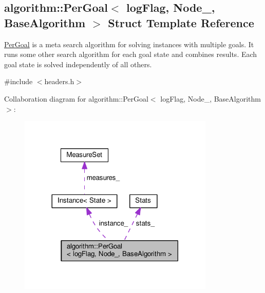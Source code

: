 \hypertarget{structalgorithm_1_1PerGoal}{}\subsection{algorithm\+:\+:Per\+Goal$<$ log\+Flag, Node\+\_\+, Base\+Algorithm $>$ Struct Template Reference}
\label{structalgorithm_1_1PerGoal}


{\ttfamily \hyperlink{structalgorithm_1_1PerGoal}{Per\+Goal}} is a meta search algorithm for solving instances with multiple goals. It runs some other search algorithm for each goal state and combines results. Each goal state is solved independently of all others.  




{\ttfamily \#include $<$headers.\+h$>$}



Collaboration diagram for algorithm\+:\+:Per\+Goal$<$ log\+Flag, Node\+\_\+, Base\+Algorithm $>$\+:\nopagebreak
\begin{figure}[H]
\begin{center}
\leavevmode
\includegraphics[width=264pt]{structalgorithm_1_1PerGoal__coll__graph}
\end{center}
\end{figure}
